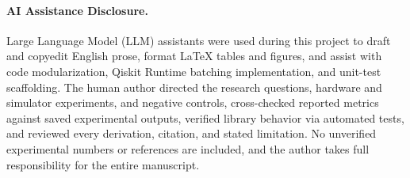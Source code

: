 \documentclass[11pt]{article}
\begin{document}
\paragraph{AI Assistance Disclosure.}
Large Language Model (LLM) assistants were used during this project to draft and copyedit English prose, format LaTeX tables and figures, and assist with code modularization, Qiskit Runtime batching implementation, and unit-test scaffolding. The human author directed the research questions, hardware and simulator experiments, and negative controls, cross-checked reported metrics against saved experimental outputs, verified library behavior via automated tests, and reviewed every derivation, citation, and stated limitation. No unverified experimental numbers or references are included, and the author takes full responsibility for the entire manuscript.
\end{document}
